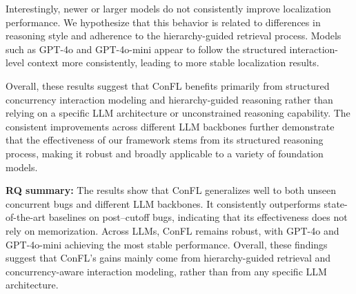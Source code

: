 Interestingly, newer or larger models do not consistently improve localization performance. We hypothesize that this behavior is related to differences in reasoning style and adherence to the hierarchy-guided retrieval process. Models such as GPT-4o and GPT-4o-mini appear to follow the structured interaction-level context more consistently, leading to more stable localization results.

Overall, these results suggest that ConFL benefits primarily from structured concurrency interaction modeling and hierarchy-guided reasoning rather than relying on a specific LLM architecture or unconstrained reasoning capability. The consistent improvements across different LLM backbones further demonstrate that the effectiveness of our framework stems from its structured reasoning process, making it robust and broadly applicable to a variety of foundation models.

\vspace{-0.5em}
\vspace*{3pt}
\begin{tcolorbox}
{\bf RQ\thefindingsCounter{} summary:} {
The results show that ConFL generalizes well to both unseen concurrent bugs and different LLM backbones.
It consistently outperforms state-of-the-art baselines on post–cutoff bugs, indicating that its effectiveness does not rely on memorization.
Across LLMs, ConFL remains robust, with GPT-4o and GPT-4o-mini achieving the most stable performance.
Overall, these findings suggest that ConFL’s gains mainly come from hierarchy-guided retrieval and concurrency-aware interaction modeling, rather than from any specific LLM architecture.
}
\end{tcolorbox}